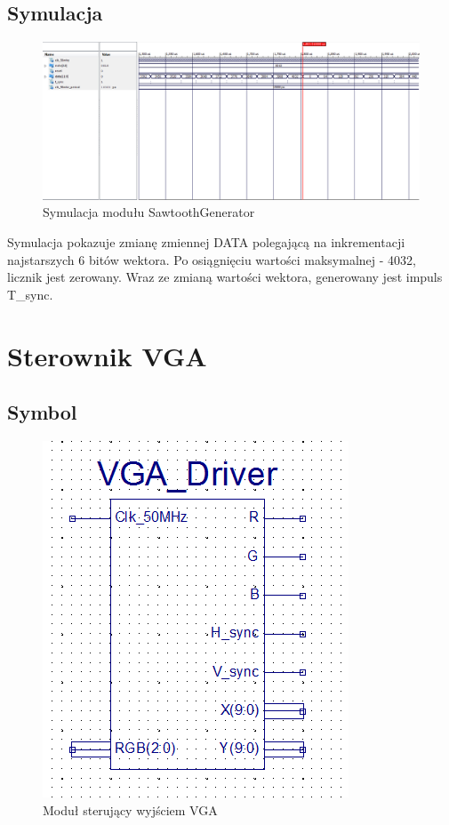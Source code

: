 \documentclass[a4paper]{report}
\begin{document}
		\begin{landscape}
			\subsection{Symulacja}
				\begin{figure}[h!]
					\centering
					\includegraphics[width=1.6\textwidth]{sawtooth_generator_symulacja2.png}
					\caption{Symulacja modułu SawtoothGenerator}
				\end{figure}
\justify Symulacja pokazuje zmianę zmiennej DATA polegającą na inkrementacji najstarszych 6 bitów wektora. Po osiągnięciu wartości maksymalnej - 4032,\\ licznik jest zerowany. Wraz ze zmianą wartości wektora, generowany jest impuls T\_sync.
		\end{landscape}
		
		\newpage
	\section{Sterownik VGA}
		\subsection{Symbol}
			\begin{figure}[h!]
				\centering
				\includegraphics{vgadriver2.png}
				\caption{Moduł sterujący wyjściem VGA}
			\end{figure}
			
\end{document}
